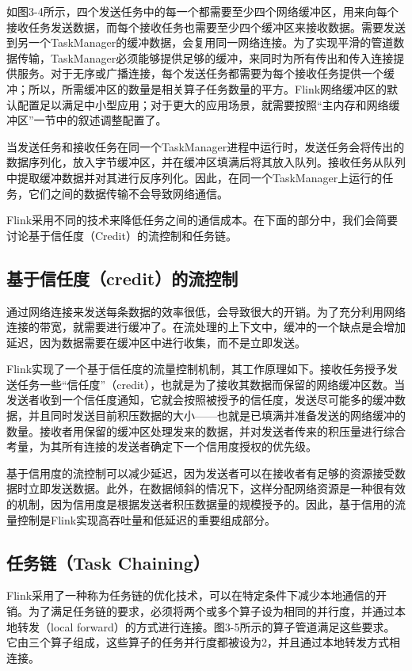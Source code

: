 \documentclass[oneside]{ctexbook}
\begin{document}
如图3-4所示，四个发送任务中的每一个都需要至少四个网络缓冲区，用来向每个接收任务发送数据，而每个接收任务也需要至少四个缓冲区来接收数据。需要发送到另一个TaskManager的缓冲数据，会复用同一网络连接。为了实现平滑的管道数据传输，TaskManager必须能够提供足够的缓冲，来同时为所有传出和传入连接提供服务。对于无序或广播连接，每个发送任务都需要为每个接收任务提供一个缓冲；所以，所需缓冲区的数量是相关算子任务数量的平方。Flink网络缓冲区的默认配置足以满足中小型应用；对于更大的应用场景，就需要按照“主内存和网络缓冲区”一节中的叙述调整配置了。

当发送任务和接收任务在同一个TaskManager进程中运行时，发送任务会将传出的数据序列化，放入字节缓冲区，并在缓冲区填满后将其放入队列。接收任务从队列中提取缓冲数据并对其进行反序列化。因此，在同一个TaskManager上运行的任务，它们之间的数据传输不会导致网络通信。

Flink采用不同的技术来降低任务之间的通信成本。在下面的部分中，我们会简要讨论基于信任度（Credit）的流控制和任务链。

\subsection{基于信任度（credit）的流控制}

通过网络连接来发送每条数据的效率很低，会导致很大的开销。为了充分利用网络连接的带宽，就需要进行缓冲了。在流处理的上下文中，缓冲的一个缺点是会增加延迟，因为数据需要在缓冲区中进行收集，而不是立即发送。

Flink实现了一个基于信任度的流量控制机制，其工作原理如下。接收任务授予发送任务一些“信任度”（credit），也就是为了接收其数据而保留的网络缓冲区数。当发送者收到一个信任度通知，它就会按照被授予的信任度，发送尽可能多的缓冲数据，并且同时发送目前积压数据的大小——也就是已填满并准备发送的网络缓冲的数量。接收者用保留的缓冲区处理发来的数据，并对发送者传来的积压量进行综合考量，为其所有连接的发送者确定下一个信用度授权的优先级。

基于信用度的流控制可以减少延迟，因为发送者可以在接收者有足够的资源接受数据时立即发送数据。此外，在数据倾斜的情况下，这样分配网络资源是一种很有效的机制，因为信用度是根据发送者积压数据量的规模授予的。因此，基于信用的流量控制是Flink实现高吞吐量和低延迟的重要组成部分。

\subsection{任务链（Task Chaining）}

Flink采用了一种称为任务链的优化技术，可以在特定条件下减少本地通信的开销。为了满足任务链的要求，必须将两个或多个算子设为相同的并行度，并通过本地转发（local forward）的方式进行连接。图3-5所示的算子管道满足这些要求。它由三个算子组成，这些算子的任务并行度都被设为2，并且通过本地转发方式相连接。
\end{document}
